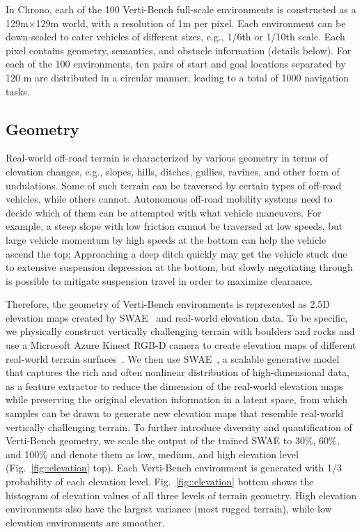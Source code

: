 In Chrono, each of the 100 Verti-Bench full-scale environments is constructed as a 129m$\times$129m world, with a resolution of 1m per pixel. Each environment can be down-scaled to cater vehicles of different sizes, e.g., 1/6th or 1/10th scale. Each pixel contains geometry, semantics, and obstacle information (details below). For each of the 100 environments, ten pairs of start and goal locations separated by 120 m are distributed in a circular manner, leading to a total of 1000 navigation tasks. 

\subsection{Geometry}
Real-world off-road terrain is characterized by various geometry in terms of elevation changes, e.g., slopes, hills, ditches, gullies, ravines, and other form of undulations. Some of such terrain can be traversed by certain types of off-road vehicles, while others cannot. Autonomous off-road mobility systems need to decide which of them can be attempted with what vehicle maneuvers. For example, a steep slope with low friction cannot be traversed at low speeds, but large vehicle momentum by high speeds at the bottom can help the vehicle ascend the top; Approaching a deep ditch quickly may get the vehicle stuck due to extensive suspension depression at the bottom, but slowly negotiating through is possible to mitigate suspension travel in order to maximize clearance.  

Therefore, the geometry of Verti-Bench environments is represented as 2.5D elevation maps created by SWAE~\cite{kolouri2018sliced} and real-world elevation data. To be specific, we physically construct vertically challenging terrain with boulders and rocks and use a Microsoft Azure Kinect RGB-D camera to create elevation maps of different real-world terrain surfaces~\cite{mikielevation2022}. We then use SWAE~\cite{kolouri2018sliced}, a scalable generative model that captures the rich and often nonlinear distribution of high-dimensional data, as a feature extractor to reduce the dimension of the real-world elevation maps while preserving the original elevation information in a latent space, from which samples can be drawn to generate new elevation maps that resemble real-world vertically challenging terrain. To further introduce diversity and quantification of Verti-Bench geometry, we scale the output of the trained SWAE to 30\%, 60\%, and 100\% and denote them as low, medium, and high elevation level (Fig.~\ref{fig::elevation} top). Each Verti-Bench environment is generated with 1/3 probability of each elevation level. Fig.~\ref{fig::elevation} bottom shows the histogram of elevation values of all three levels of terrain geometry. High elevation environments also have the largest variance (most rugged terrain), while low elevation environments are smoother. 

